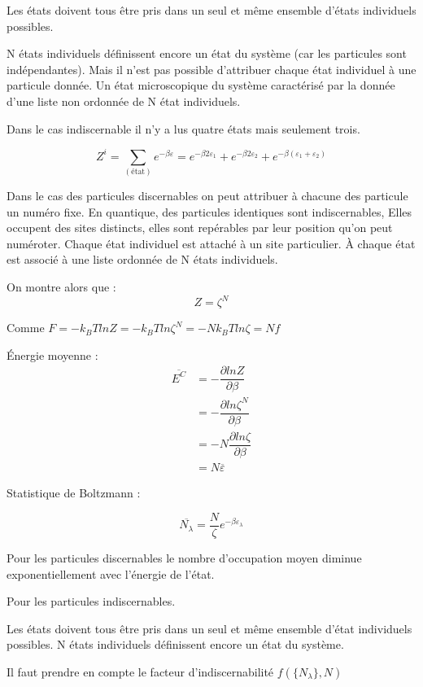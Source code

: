 \documentclass[12pt,a4paper]{report}
\begin{document}
Les états doivent tous être pris dans un seul et même ensemble d'états individuels possibles.

N états individuels définissent encore un état du système (car les particules sont indépendantes).
Mais il n'est pas possible d'attribuer chaque état individuel à une particule donnée.
Un état microscopique du système caractérisé par la donnée d'une liste non ordonnée de N état individuels.

Dans le cas indiscernable il n'y a lus quatre états mais seulement trois.

\[
	Z^i = \sum_{(\text{état})} e^{-\beta \varepsilon} = e^{-\beta 2 \varepsilon_1}+e^{-\beta 2 \varepsilon_2} + e^{-\beta (\varepsilon_1 + \varepsilon_2)}
\]

Dans le cas des particules discernables on peut attribuer à chacune des particule un numéro fixe.
En quantique, des particules identiques sont indiscernables,
Elles occupent des sites distincts, elles sont repérables par leur position qu'on peut numéroter.
Chaque état individuel est attaché à un site particulier.
À chaque état est associé à une liste ordonnée de N états individuels.

On montre alors que :
\[
	Z = \zeta^N
\]

Comme $F = -k_B T ln Z = - k_B T ln \zeta^N = - N k_B T ln \zeta = N f$

Énergie moyenne :
\begin{align*}
	\overline{E^C} &= - \dfrac{\partial ln Z}{\partial \beta}\\
	&= -\dfrac{\partial ln \zeta^N}{ \partial \beta}\\
	&= -N \dfrac{\partial ln \zeta}{ \partial \beta}\\
	&= N \overline{\varepsilon}
\end{align*}

Statistique de Boltzmann :

\[
	\overline{N_\lambda} = \dfrac{N}{\zeta} e^{-\beta \varepsilon_\lambda}
\]

Pour les particules discernables le nombre d'occupation moyen diminue exponentiellement avec l'énergie de l'état.

Pour les particules indiscernables.

Les états doivent tous être pris dans un seul et même ensemble d'état individuels possibles.
N états individuels définissent encore un état du système.

Il faut prendre en compte le facteur d'indiscernabilité $f(\lbrace N_\lambda \rbrace, N)$
\end{document}
